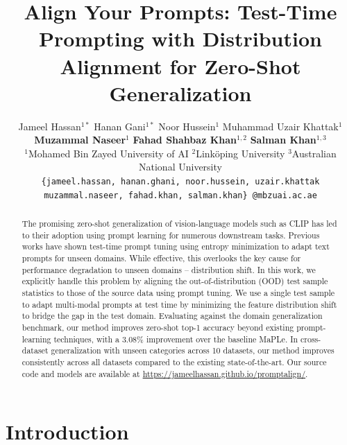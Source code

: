 \documentclass[a4paper]{article}
\title{Align Your Prompts: Test-Time Prompting with Distribution Alignment for Zero-Shot Generalization}
\author{%
Jameel Hassan$^{1*}$ \quad Hanan Gani$^{1*}$ \quad Noor Hussein$^1$ \quad Muhammad Uzair Khattak$^1$ \\ \textbf{Muzammal Naseer}$^1$ \quad \textbf{Fahad Shahbaz Khan}$^{1,2}$ \quad 
\textbf{Salman Khan}$^{1,3}$ \\
$^1$Mohamed Bin Zayed University of AI
\quad $^2$Link{\"o}ping University
\quad $^3$Australian National University \\
\texttt{\{jameel.hassan, hanan.ghani, noor.hussein, uzair.khattak}\\
\texttt{muzammal.naseer, fahad.khan, salman.khan\} @mbzuai.ac.ae}\\
}
\newcommand{\jh}[1]{{\color{blue}JH: #1}}
\begin{document}
\maketitle
\def\thefootnote{*}

\begin{abstract}
     The promising zero-shot generalization of vision-language models such as CLIP has led to their adoption using prompt learning for numerous downstream tasks. Previous works have shown test-time prompt tuning using entropy minimization to adapt text prompts for unseen domains. While effective, this overlooks the key cause for performance degradation to unseen domains -- distribution shift. In this work, we explicitly handle this problem by aligning the out-of-distribution (OOD) test sample statistics to those of the source data using prompt tuning. We use a single test sample to adapt multi-modal prompts at test time by minimizing the feature distribution shift to bridge the gap in the test domain. Evaluating against the domain generalization benchmark, our method improves zero-shot top-1 accuracy beyond existing prompt-learning techniques, with a $3.08\%$ improvement over the baseline MaPLe. In cross-dataset generalization with unseen categories across 10 datasets, our method improves consistently across all datasets compared to the existing state-of-the-art. Our source code and models
     are available at \href{https://jameelhassan.github.io/promptalign/}{https://jameelhassan.github.io/promptalign/}.
\end{abstract}

\section{Introduction}

\end{document}
